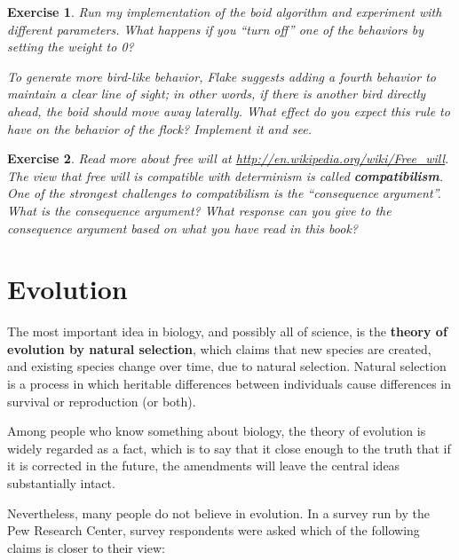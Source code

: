 \documentclass[12pt]{book}
\theoremstyle{exercise}
\newtheorem{exercise}{Exercise}[chapter]
\begin{document}
\begin{exercise}


Run my implementation of the boid algorithm and experiment with
different parameters.  What happens if you ``turn off'' one
of the behaviors by setting the weight to 0?

To generate more bird-like behavior, Flake suggests adding a fourth
behavior to maintain a clear line of sight; in other words, if there
is another bird directly ahead, the boid should move away
laterally.  What effect do you expect this rule to have on the
behavior of the flock?  Implement it and see.

\end{exercise}


\begin{exercise}

Read more about free will at
\url{http://en.wikipedia.org/wiki/Free_will}.  The view that free will
is compatible with determinism is called {\bf compatibilism}.  One of
the strongest challenges to compatibilism is the ``consequence
argument''.  What is the consequence argument?  What response can you
give to the consequence argument based on what you have read in this
book?

\end{exercise}





\chapter{Evolution}

The most important idea in biology, and possibly all of science, is the {\bf theory of evolution by natural selection}, which claims that new species are created, and existing species change over time, due to natural selection.  Natural selection is a process in which heritable differences between individuals cause differences in survival or reproduction (or both).

Among people who know something about biology, the theory of evolution is widely regarded as a fact, which is to say that it close enough to the truth that if it is corrected in the future, the amendments will leave the central ideas substantially intact.

Nevertheless, many people do not believe in evolution.  In a survey run by the Pew Research Center, survey respondents were asked which of the following claims is closer to their view:
\end{document}
